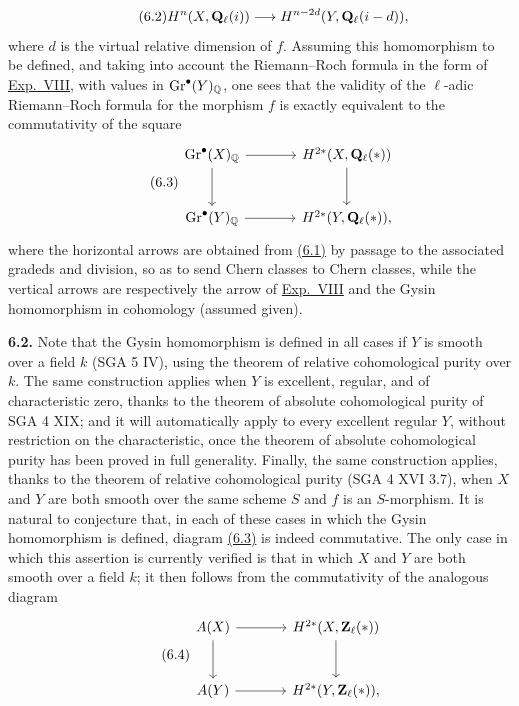 \begin{equation}\tag{6.2}
 H^n(X,\mathbf Q_\ell(i))\longrightarrow H^{n-2d}(Y,\mathbf Q_\ell(i-d)),
\end{equation}
where $d$ is the virtual relative dimension of $f$. Assuming this
homomorphism to be defined, and taking into account the Riemann--Roch formula
in the form of \hyperlink{sga6.e08.expose}{Exp.~VIII}, with values in
$\operatorname{Gr}^\bullet(Y)_{\mathbb Q}$, one sees that the validity of the
$\ell$-adic Riemann--Roch formula for the morphism $f$ is exactly equivalent
to the commutativity of the square
\begin{equation}\tag{6.3}
\begin{tikzcd}[column sep=large,row sep=large]
 \operatorname{Gr}^\bullet(X)_{\Q} \arrow[r] \arrow[d]
   & H^{2*}(X,\Qell(*)) \arrow[d] \\
 \operatorname{Gr}^\bullet(Y)_{\Q} \arrow[r]
   & H^{2*}(Y,\Qell(*)),
\end{tikzcd}
\end{equation}
where the horizontal arrows are obtained from \hyperlink{sga6.e14.eq.6-1}{(6.1)} by passage to the
associated gradeds and division, so as to send Chern classes to Chern
classes, while the vertical arrows are respectively the arrow of \hyperlink{sga6.e08.expose}{Exp.~VIII}
and the Gysin homomorphism in cohomology (assumed given).

\noindent{}\textbf{6.2.}
Note that the Gysin homomorphism is defined in all cases if $Y$ is smooth
over a field $k$ (SGA 5 IV), using the theorem of relative cohomological
purity over $k$. The same construction applies when $Y$ is excellent,
regular, and of characteristic zero, thanks to the theorem of absolute
cohomological purity of SGA 4 XIX; and it will automatically apply to every
excellent regular $Y$, without restriction on the characteristic, once the
theorem of absolute cohomological purity has been proved in full generality.
Finally, the same construction applies, thanks to the theorem of relative
cohomological purity (SGA 4 XVI 3.7), when $X$ and $Y$ are both smooth over
the same scheme $S$ and $f$ is an $S$-morphism. It is natural to conjecture
that, in each of these cases in which the Gysin homomorphism is defined,
diagram \hyperlink{sga6.e14.eq.6-3}{(6.3)} is indeed commutative. The only case in which this assertion
is currently verified is that in which $X$ and $Y$ are both smooth over a
field $k$; it then follows from the commutativity of the analogous diagram
\begin{equation}\tag{6.4}
\begin{tikzcd}[column sep=large,row sep=large]
 A(X) \arrow[r] \arrow[d]
   & H^{2*}(X,\Zell(*)) \arrow[d] \\
 A(Y) \arrow[r]
   & H^{2*}(Y,\Zell(*)),
\end{tikzcd}
\end{equation}

